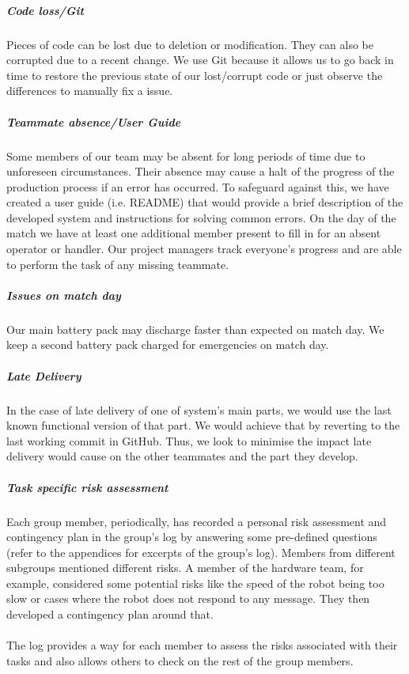 \subparagraph{Code loss/Git}
Pieces of code can be lost due to deletion or modification. They can also be corrupted due to a recent change. We use Git because it allows us to go back in time to restore the previous state of our lost/corrupt code or just observe the differences to manually fix a issue.

\subparagraph{Teammate absence/User Guide}
Some members of our team may be absent for long periods of time due to unforeseen circumstances. Their absence may cause a halt of the progress of the production process if an error has occurred. To safeguard against this, we have created a user guide (i.e. README) that would provide a brief description of the developed system and  instructions for solving common errors. On the day of the match we have at least one additional member present to fill in for an absent operator or handler.  Our project managers track everyone's progress and are able to perform the task of any missing teammate. 

\subparagraph{Issues on match day}
Our main battery pack may discharge faster than expected on match day. We keep a second battery pack charged for emergencies on match day.

\subparagraph{Late Delivery}
In the case of late delivery of one of system's main parts, we would use the last known functional version of that part. We would achieve that by reverting to the last working commit in GitHub. Thus, we look to minimise the impact late delivery would cause on the other teammates and the part they develop.

\subparagraph{Task specific risk assessment}
Each group member, periodically, has recorded a personal risk assessment and contingency plan in the group's log by answering some pre-defined questions (refer to the appendices for excerpts of the group's log). Members from different subgroups mentioned different risks. A member of the hardware team, for example,   considered some potential risks like the speed of the robot being too slow or cases where the robot does not respond to any message. They then developed a contingency plan around that. 
\\ \\ The log provides a way for each member to assess the risks associated with their tasks and also allows others to check on the rest of the group members.

\iffalse
key is hidden in safe place
have 2 code repos we have run - fred and craig's robot
what to do in budget inefficiency?
how to test if pitch is full?
IDEAS
Where should staff meet in the event the building is not accessible?
Who has the authority to close the business in the event of an emergency?
Which staff members are critical and must be on-site or always reachable?
Where are the back-ups and how are they restored?
Who can cover for each critical staff member?
Who are single points of failure and how can those risks be ameliorated?
What systems, vendors, and partners pose risk should they fail?
Who is responsible for communicating with customers, and how?
\fi
